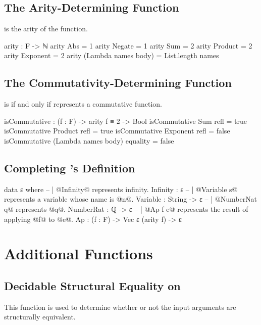 \documentclass{report}
\begin{document}
\subsection{The Arity-Determining Function}
  is the arity of the  function.

\begin{code}
arity : F -> ℕ
arity Abs = 1
arity Negate = 1
arity Sum = 2
arity Product = 2
arity Exponent = 2
arity (Lambda names body) = List.length names
\end{code}

\subsection{The Commutativity-Determining Function}
   is  if and only if  represents a commutative function.

\begin{code}
isCommutative : (f : F) -> arity f ≡ 2 -> Bool
isCommutative Sum refl = true
isCommutative Product refl = true
isCommutative Exponent refl = false
isCommutative (Lambda names body) equality = false
\end{code}

\subsection{Completing 's Definition}

\begin{code}
data ε where
  -- | @Infinity@ represents infinity.
  Infinity : ε
  -- | @Variable s@ represents a variable whose name is @n@.
  Variable : String -> ε
  -- | @NumberNat q@ represents @q@.
  NumberRat : ℚ -> ε
  -- | @Ap f e@ represents the result of applying @f@ to @e@.
  Ap : (f : F) -> Vec ε (arity f) -> ε
\end{code}

\section{Additional Functions}

\subsection{Decidable Structural Equality on }
This function is used to determine whether or not the input arguments are structurally equivalent.
\end{document}
